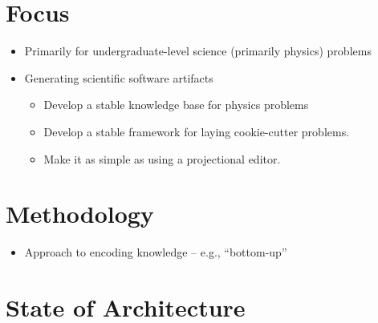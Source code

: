 \section{Focus}

\begin{itemize}

    \item Primarily for undergraduate-level science (primarily physics) problems

    \item Generating scientific software artifacts
          \begin{itemize}
              \item Develop a stable knowledge base for physics problems

              \item Develop a stable framework for laying cookie-cutter
                    problems.

              \item Make it as simple as using a projectional editor.

          \end{itemize}
\end{itemize}

\section{Methodology}

\begin{itemize}
    \item Approach to encoding knowledge -- e.g., ``bottom-up''
\end{itemize}

\section{State of Architecture}

